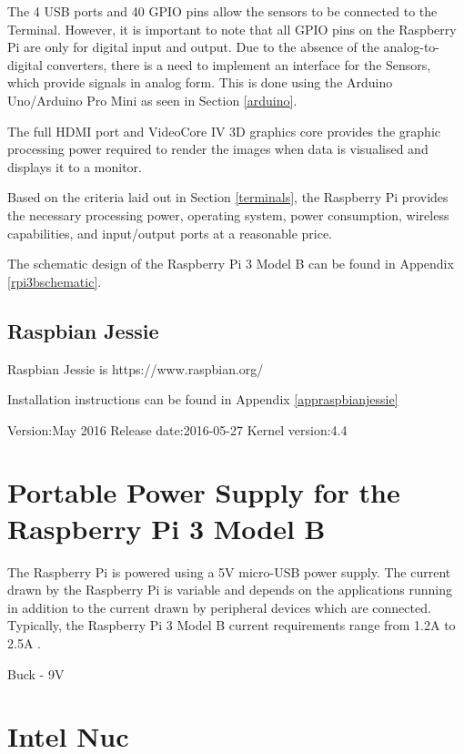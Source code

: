 The 4 USB ports and 40 GPIO pins allow the sensors to be connected to the Terminal. However, it is important to note that all GPIO pins on the Raspberry Pi are only for digital input and output. Due to the absence of the analog-to-digital converters, there is a need to implement an interface for the Sensors, which provide signals in analog form. This is done using the Arduino Uno/Arduino Pro Mini as seen in Section \ref{arduino}. 

The full HDMI port and VideoCore IV 3D graphics core provides the graphic processing power required to render the images when data is visualised and displays it to a monitor. 

Based on the criteria laid out in Section \ref{terminals}, the Raspberry Pi provides the necessary processing power, operating system, power consumption, wireless capabilities, and input/output ports at a reasonable price. 

The schematic design of the Raspberry Pi 3 Model B can be found in Appendix \ref{rpi3bschematic}.

\cite{rpi3hardware}


\subsection{Raspbian Jessie}

Raspbian Jessie is 
\cite{rpi3raspbian}
https://www.raspbian.org/

Installation instructions can be found in Appendix \ref{appraspbianjessie}


Version:May 2016
Release date:2016-05-27
Kernel version:4.4


\section{Portable Power Supply for the Raspberry Pi 3 Model B}
\cite{rpi3faqs}

The Raspberry Pi is powered using a 5V micro-USB power supply\cite{rpi3faqs}. The current drawn by the Raspberry Pi is variable and depends on the applications running in addition to the current drawn by peripheral devices which are connected. Typically, the Raspberry Pi 3 Model B current requirements range from 1.2A to 2.5A \cite{rpi3faqs}. 

Buck - 9V

\section{Intel Nuc}

